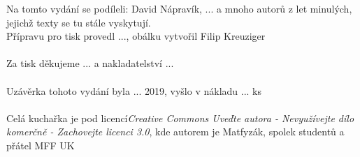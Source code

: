 \tableofcontents
{}
\vspace*{\fill}
\noindent Na tomto vydání se podíleli: David Nápravík, ... 
a mnoho autorů z let minulých, jejichž texty se tu stále vyskytují.
\\
Přípravu pro tisk provedl ..., obálku vytvořil Filip Kreuziger
\\\\
Za tisk děkujeme ... a nakladatelství ...
\\\\
Uzávěrka tohoto vydání byla ... 2019, vyšlo v nákladu ... ks
\\\\
Celá kuchařka je pod licencí\textit{Creative Commons Uveďte autora -
Nevyužívejte dílo komerčně - Zachovejte licenci 3.0}, kde autorem je Matfyzák,
spolek studentů a přátel MFF UK
\newpage
{}